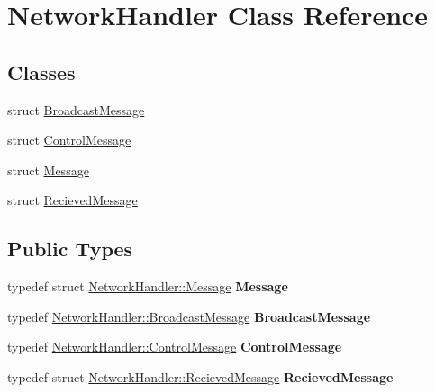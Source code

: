 \hypertarget{classNetworkHandler}{}\section{Network\+Handler Class Reference}
\label{classNetworkHandler}
\subsection*{Classes}
\begin{DoxyCompactItemize}
\item 
struct \hyperlink{structNetworkHandler_1_1BroadcastMessage}{Broadcast\+Message}
\item 
struct \hyperlink{structNetworkHandler_1_1ControlMessage}{Control\+Message}
\item 
struct \hyperlink{structNetworkHandler_1_1Message}{Message}
\item 
struct \hyperlink{structNetworkHandler_1_1RecievedMessage}{Recieved\+Message}
\end{DoxyCompactItemize}
\subsection*{Public Types}
\begin{DoxyCompactItemize}
\item 
typedef struct \hyperlink{structNetworkHandler_1_1Message}{Network\+Handler\+::\+Message} {\bfseries Message}\hypertarget{classNetworkHandler_a40a384ea43787b06682a000b015add29}{}\label{classNetworkHandler_a40a384ea43787b06682a000b015add29}

\item 
typedef \hyperlink{structNetworkHandler_1_1BroadcastMessage}{Network\+Handler\+::\+Broadcast\+Message} {\bfseries Broadcast\+Message}\hypertarget{classNetworkHandler_a5efffc9f48abe8087c6f756e33d5eb9e}{}\label{classNetworkHandler_a5efffc9f48abe8087c6f756e33d5eb9e}

\item 
typedef \hyperlink{structNetworkHandler_1_1ControlMessage}{Network\+Handler\+::\+Control\+Message} {\bfseries Control\+Message}\hypertarget{classNetworkHandler_a29cb429e8069fa3c00b8317aec0b735a}{}\label{classNetworkHandler_a29cb429e8069fa3c00b8317aec0b735a}

\item 
typedef struct \hyperlink{structNetworkHandler_1_1RecievedMessage}{Network\+Handler\+::\+Recieved\+Message} {\bfseries Recieved\+Message}\hypertarget{classNetworkHandler_a558eabe1d275787ab92e63c7bbabf19c}{}\label{classNetworkHandler_a558eabe1d275787ab92e63c7bbabf19c}

\end{DoxyCompactItemize}
